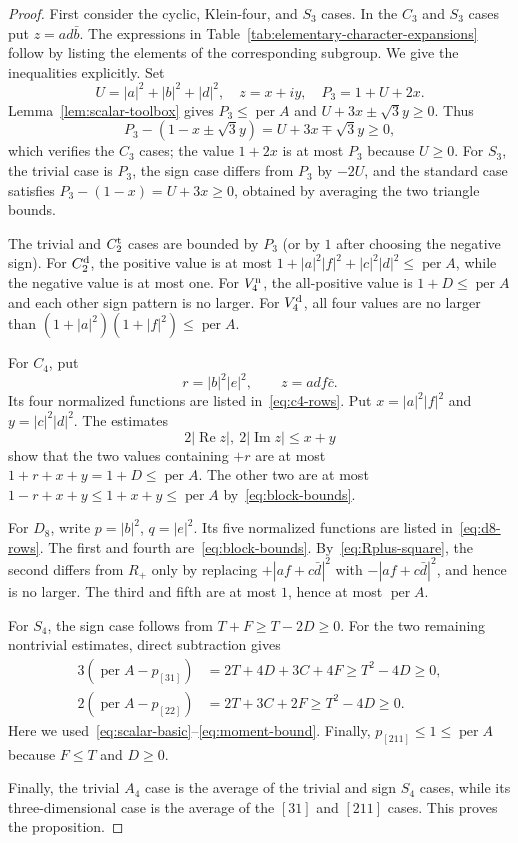 \documentclass[10pt,twoside]{siamart1116}
\newcommand{\per}{\operatorname{per}}
\newcommand{\Rea}{\operatorname{Re}}
\newcommand{\Ima}{\operatorname{Im}}
\begin{document}
\begin{proof}
First consider the cyclic, Klein-four, and $S_3$ cases.  In the $C_3$ and
$S_3$ cases put $z=ad\bar b$.  The expressions in
Table~\ref{tab:elementary-character-expansions} follow by listing the elements
of the corresponding subgroup.  We give the inequalities explicitly.  Set
\[
 U=|a|^2+|b|^2+|d|^2,\quad z=x+iy,\quad
 P_3=1+U+2x.
\]
Lemma~\ref{lem:scalar-toolbox} gives $P_3\leq\per A$ and
$U+3x\pm\sqrt3y\geq0$.  Thus
\[
 P_3-(1-x\pm\sqrt3y)=U+3x\mp\sqrt3y\geq0,
\]
which verifies the $C_3$ cases; the value $1+2x$ is at most $P_3$ because
$U\geq0$.  For $S_3$, the trivial case is $P_3$, the sign case differs from
$P_3$ by $-2U$, and the standard case satisfies
$P_3-(1-x)=U+3x\geq0$, obtained by averaging the two triangle bounds.

The trivial and $C_2^{\rm t}$ cases are bounded by $P_3$ (or by $1$ after
choosing the negative sign).  For $C_2^{\rm d}$, the positive value is at
most $1+|a|^2|f|^2+|c|^2|d|^2\leq\per A$, while the negative value is at
most one.  For $V_4^{\rm n}$, the all-positive value is
$1+D\leq\per A$ and each other sign pattern is no larger.  For
$V_4^{\rm d}$, all four values are no larger than
$(1+|a|^2)(1+|f|^2)\leq\per A$.

For $C_4$, put
\[
 r=|b|^2|e|^2,\qquad z=adf\bar c.
\]
Its four normalized functions are listed in~\eqref{eq:c4-rows}.
Put $x=|a|^2|f|^2$ and $y=|c|^2|d|^2$.  The estimates
\[
 2|\Rea z|,\ 2|\Ima z|
 \leq x+y
\]
show that the two values containing $+r$ are at most
$1+r+x+y=1+D\leq\per A$.  The other two are at most
$1-r+x+y\leq1+x+y\leq\per A$ by~\eqref{eq:block-bounds}.

For $D_8$, write $p=|b|^2$, $q=|e|^2$.  Its five normalized functions
are listed in~\eqref{eq:d8-rows}.
The first and fourth are~\eqref{eq:block-bounds}.  By~\eqref{eq:Rplus-square},
the second differs from $R_+$ only by replacing
$+|af+c\bar d|^2$ with $-|af+c\bar d|^2$, and hence is no larger.  The third
and fifth are at most $1$, hence at most $\per A$.

For $S_4$, the sign case follows from
$T+F\geq T-2D\geq0$.  For the two remaining
nontrivial estimates, direct subtraction gives
\begin{align*}
 3(\per A-p_{[31]})
   &=2T+4D+3C+4F
     \geq T^2-4D\geq0,\\
 2(\per A-p_{[22]})
   &=2T+3C+2F
     \geq T^2-4D\geq0.
\end{align*}
Here we used~\eqref{eq:scalar-basic}--\eqref{eq:moment-bound}.  Finally,
$p_{[211]}\leq1\leq\per A$ because
$F\leq T$ and $D\geq0$.

Finally, the trivial $A_4$ case is the average of the trivial and sign $S_4$
cases, while its three-dimensional case is the average of the $[31]$ and
$[211]$ cases.  This proves the proposition.
\end{proof}
\end{document}
